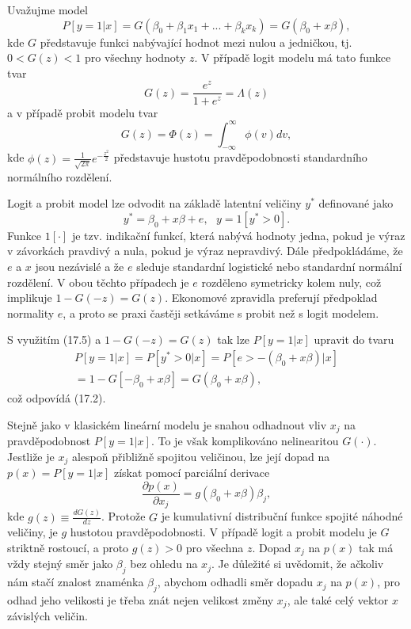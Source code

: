 Uvažujme model
\begin{equation}
P[y=1 | x] = G(\beta_0 + \beta_1 x_1 + ... + \beta_k x_k) = G(\beta_0 + x \beta),
\end{equation}
kde $G$ představuje funkci nabývající hodnot mezi nulou a jedničkou, tj. $0 < G(z) < 1$ pro všechny hodnoty $z$. V případě logit modelu má tato funkce tvar
\begin{equation}
G(z) = \frac{e^z}{1 + e^z} = \Lambda(z)
\end{equation}
a v případě probit modelu tvar
\begin{equation}
G(z) = \Phi(z) = \int_{-\infty}^{\infty}\phi(v)dv,
\end{equation}
kde $\phi(z) = \frac{1}{\sqrt{2 \pi}}e^{-\frac{z^2}{2}}$ představuje hustotu pravděpodobnosti standardního normálního rozdělení.

Logit a probit model lze odvodit na základě latentní veličiny $y^*$ definované jako
\begin{equation}
y^* = \beta_0 + x \beta + e, ~~~ y = 1[y^* > 0].
\end{equation}
Funkce $1[\cdot]$ je tzv. indikační funkcí, která nabývá hodnoty jedna, pokud je výraz v závorkách pravdivý a nula, pokud je výraz nepravdivý. Dále předpokládáme, že $e$ a $x$ jsou nezávislé a že $e$ sleduje standardní logistické nebo standardní normální rozdělení. V obou těchto případech je $e$ rozděleno symetricky kolem nuly, což implikuje $1 - G(-z) = G(z)$. Ekonomové zpravidla preferují předpoklad normality $e$, a proto se praxi častěji setkáváme s probit než s logit modelem.

S využitím (17.5) a $1 - G(-z) = G(z)$ tak lze $P[y = 1 | x]$ upravit do tvaru
\begin{multline}
P[y = 1 | x] = P[y^* > 0 | x] = P[e > -(\beta_0 + x \beta) | x]\\
= 1 - G[-\beta_0 + x\beta] = G(\beta_0 + x \beta),
\end{multline}
což odpovídá (17.2).

Stejně jako v klasickém lineární modelu je snahou odhadnout vliv $x_j$ na pravděpodobnost $P[y=1|x]$. To je však komplikováno nelinearitou $G(\cdot)$. Jestliže je $x_j$ alespoň přibližně spojitou veličinou, lze její dopad na $p(x) = P[y = 1 | x]$ získat pomocí parciální derivace
\begin{equation}
\frac{\partial p(x)}{\partial x_j} = g(\beta_0 + x \beta)\beta_j,
\end{equation}
kde $g(z) \equiv \frac{dG(z)}{dz}$. Protože $G$ je kumulativní distribuční funkce spojité náhodné veličiny, je $g$ hustotou pravděpodobnosti. V případě logit a probit modelu je $G$ striktně rostoucí, a proto $g(z) > 0$ pro všechna $z$. Dopad $x_j$ na $p(x)$ tak má vždy stejný směr jako $\beta_j$ bez ohledu na $x_j$. Je důležité si uvědomit, že ačkoliv nám stačí znalost znaménka $\beta_j$, abychom odhadli směr dopadu $x_j$ na $p(x)$, pro odhad jeho velikosti je třeba znát nejen velikost změny $x_j$, ale také celý vektor $x$ závislých veličin.

